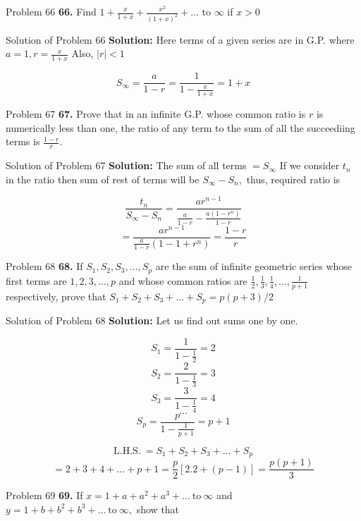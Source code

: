 \documentclass[aspectratio=1610,8pt]{beamer}
\begin{document}
\begin{frame}{Problem 66}
  \textbf{66.} Find $1 + \frac{x}{1 + x} + \frac{x^2}{(1 + x)^2} + \ldots$ to $\infty$ if $x > 0$
\end{frame}
\begin{frame}{Solution of Problem 66}
  \textbf{Solution:} Here terms of a given series are in G.P. where $a = 1, r = \frac{x}{1 + x}$ Also, $|r| < 1$

  $$S_\infty = \frac{a}{1 - r} = \frac{1}{1 - \frac{x}{1 + x}} = 1 + x$$
\end{frame}
\begin{frame}{Problem 67}
  \textbf{67.} Prove that in an infinite G.P. whose common ratio is $r$ is numerically less than one, the ratio of any term to the
  sum of all the succeediing terms is $\frac{1 - r}{r}$.
\end{frame}
\begin{frame}{Solution of Problem 67}
  \textbf{Solution:} The sum of all terms $= S_\infty$ If we consider $t_n$ in the ratio then sum of rest of terms will be
  $S_\infty - S_n,$ thus, required ratio is

  $$\frac{t_n}{S_\infty - S_n} = \frac{ar^{n - 1}}{\frac{a}{1 - r} - \frac{a(1 - r^n)}{1 - r}}$$
  $$= \frac{ar^{n - 1}}{\frac{a}{1 - r}(1 - 1 + r^{n})} = \frac{1- r}{r}$$
\end{frame}
\begin{frame}{Problem 68}
  \textbf{68.} If $S_1, S_2, S_3, \ldots, S_p$ are the sum of infinite geometric series whose first terms are $1, 2, 3, \ldots, p$
  and whose common ratios are $\frac{1}{2}, \frac{1}{3}, \frac{1}{4}, \ldots, \frac{1}{p + 1}$ respectively, prove that $S_1 + S_2
  + S_3 + \ldots + S_p = p(p + 3)/2$
\end{frame}
\begin{frame}{Solution of Problem 68}
  \textbf{Solution:} Let us find out sums one by one.

  $$S_1 = \frac{1}{1 - \frac{1}{2}} = 2$$
  $$S_2 = \frac{2}{1 - \frac{1}{3}} = 3$$
  $$S_3 = \frac{3}{1 - \frac{1}{4}} = 4$$
  $$\ldots$$
  $$S_p = \frac{p}{1 - \frac{1}{p + 1}} = p + 1$$

  $$\text{L.H.S.}~= S_1 + S_2 + S_3 + \ldots + S_p$$
  $$= 2 + 3 + 4 + \ldots + p + 1 = \frac{p}{2}[2.2 + (p - 1)] = \frac{p(p + 1)}{3}$$
\end{frame}
\begin{frame}{Problem 69}
  \textbf{69.} If $x = 1 + a + a^2 + a^3 + \ldots~\text{to}~\infty$ and $y = 1 + b + b^2 + b^3 + \ldots~\text{to}~\infty,$ show
  that
\end{frame}
\end{document}
